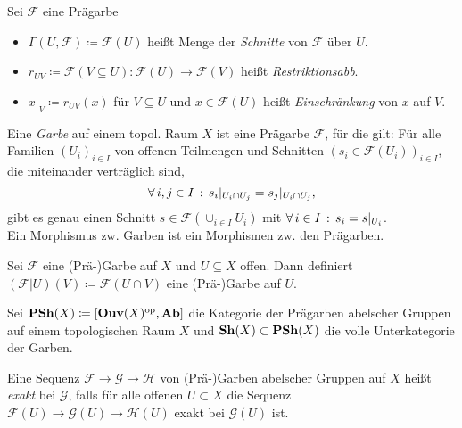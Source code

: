 \documentclass{cheat-sheet}
\newcommand{\Fais}{\mathcal{F}} %
\newcommand{\Garb}{\mathcal{G}} %
\newcommand{\Harb}{\mathcal{H}} %
\begin{document}
\begin{nota}
  Sei $\Fais$ eine Prägarbe
  \begin{itemize}
    \item $\Gamma(U, \Fais) \coloneqq \Fais(U)$ heißt Menge der \emph{Schnitte} von $\Fais$ über $U$.
    \item $r_{UV} \coloneqq \Fais(V \subseteq U) : \Fais(U) \to \Fais(V)$ heißt \emph{Restriktionsabb}.
    \item $x|_V \coloneqq r_{UV}(x)$ für $V \subseteq U$ und $x \in \Fais(U)$ heißt \emph{Einschränkung} von $x$ auf $V$.
  \end{itemize}
\end{nota}

\begin{defn}
  Eine \emph{Garbe} auf einem topol. Raum $X$ ist eine Prägarbe $\Fais$, für die gilt:
  Für alle Familien $(U_i)_{i \in I}$ von offenen Teilmengen und Schnitten $(s_i \in \Fais(U_i))_{i \in I}$, die miteinander verträglich sind, \dh{}
  \[ \forall \, {i, j \in I} \,:\, s_i|_{U_i \cap U_j} = s_j|_{U_i \cap U_j}, \]
  gibt es genau einen Schnitt $s \in \Fais(\cup_{i \in I} U_i)$ mit $\forall \, {i \in I} \,:\, s_i = s|_{U_i}$.\\
  Ein Morphismus zw. Garben ist ein Morphismen zw. den Prägarben.
\end{defn}

\begin{bem}
  Sei $\Fais$ eine (Prä-)Garbe auf $X$ und $U \subseteq X$ offen. Dann definiert $(\Fais|U)(V) \coloneqq \Fais(U \cap V)$ eine (Prä-)Garbe auf $U$.
\end{bem}

\begin{nota}
  Sei $\mathbf{PSh}(X) \coloneqq [\mathbf{Ouv}(X)^{\mathrm{op}}, \mathbf{Ab}]$ die Kategorie der Prägarben abelscher Gruppen auf einem topologischen Raum $X$ und $\mathbf{Sh}(X) \subset \mathbf{PSh}(X)$ die volle Unterkategorie der Garben.
\end{nota}



\begin{defn}
  Eine Sequenz $\Fais \to \Garb \to \Harb$ von (Prä-)Garben abelscher Gruppen auf $X$ heißt \emph{exakt} bei $\Garb$, falls für alle offenen $U \subset X$ die Sequenz $\Fais(U) \to \Garb(U) \to \Harb(U)$ exakt bei $\Garb(U)$ ist.
\end{defn}
\end{document}
